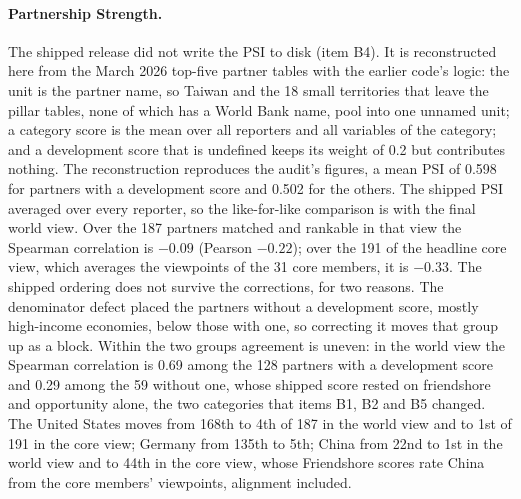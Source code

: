 \paragraph{Partnership Strength.} The shipped release did not write the PSI to disk (item B4).
It is reconstructed here from the March 2026 top-five partner tables with the earlier code's
logic: the unit is the partner name, so Taiwan and the 18 small territories that leave the
pillar tables, none of which has a World Bank name, pool into one unnamed unit; a category score
is the mean over all reporters and all variables of the category; and a development score that
is undefined keeps its weight of 0.2 but contributes nothing. The reconstruction reproduces the
audit's figures, a mean PSI of 0.598 for partners with a development score and 0.502 for the
others. The shipped PSI averaged over every reporter, so the like-for-like comparison is with the
final world view. Over the 187 partners matched and rankable in that view the Spearman correlation
is $-0.09$ (Pearson $-0.22$); over the 191 of the headline core view, which averages the
viewpoints of the 31 core members, it is $-0.33$. The shipped ordering does not survive the
corrections, for two reasons. The denominator defect placed the partners without a development
score, mostly high-income economies, below those with one, so correcting it moves that group up
as a block. Within the two groups agreement is uneven: in the world view the Spearman correlation
is 0.69 among the 128 partners with a development score and 0.29 among the 59 without one, whose
shipped score rested on friendshore and opportunity alone, the two categories that items B1, B2
and B5 changed. The United States moves from 168th to 4th of 187 in the world view and to 1st of
191 in the core view; Germany from 135th to 5th; China from 22nd to 1st in the world view and to
44th in the core view, whose Friendshore scores rate China from the core members' viewpoints,
alignment included.

